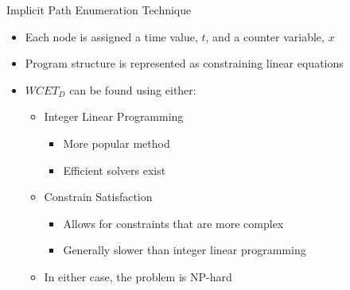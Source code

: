 \documentclass{beamer}
\begin{document}
\begin{frame}[IPET]{Implicit Path Enumeration Technique}
  \begin{itemize}
    \item Each node is assigned a time value, $t$, and a counter variable, $x$
    \item Program structure is represented as constraining linear equations
    \item $WCET_D$ can be found using either:
      \begin{itemize}
      \item Integer Linear Programming
        \begin{itemize}
          \item More popular method
          \item Efficient solvers exist
        \end{itemize}
      \item Constrain Satisfaction
        \begin{itemize}
          \item Allows for constraints that are more complex
          \item Generally slower than integer linear programming
        \end{itemize}
      \item In either case, the problem is NP-hard
      \end{itemize}
  \end{itemize}
\end{frame}
\end{document}
